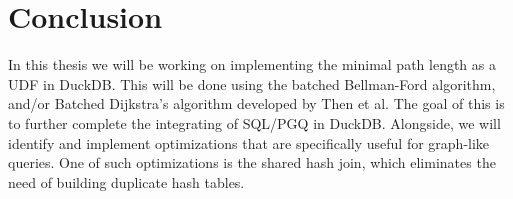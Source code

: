 \section{Conclusion}\label{sec:conclusion}
In this thesis we will be working on implementing the minimal path length as a UDF in DuckDB. This will be done using the batched Bellman-Ford algorithm, and/or Batched Dijkstra's algorithm developed by Then et al. The goal of this is to further complete the integrating of SQL/PGQ in DuckDB. Alongside, we will identify and implement optimizations that are specifically useful for graph-like queries. One of such optimizations is the shared hash join, which eliminates the need of building duplicate hash tables. 

